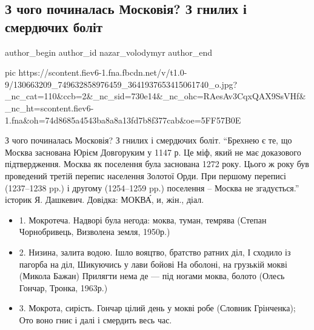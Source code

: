  
 
 
 
 
 
\subsection{З чого починалась Московія? З гнилих і смердючих боліт}
\label{sec:07_12_2020.fb.nazar_volodymyr.1.z_chogo_pochynalas_moskovia}
\ifcmt
	author_begin
   author_id nazar_volodymyr
	author_end
\fi

\ifcmt
pic https://scontent.fiev6-1.fna.fbcdn.net/v/t1.0-9/130663209_749632858976459_3641937653415061740_o.jpg?_nc_cat=110&ccb=2&_nc_sid=730e14&_nc_ohc=RAesAv3CqxQAX9SsVHf&_nc_ht=scontent.fiev6-1.fna&oh=74d8685a4543ba8a8a13fd7b8f377cab&oe=5FF57B0E
\fi

З чого починалась Московія? З гнилих і смердючих боліт. \enquote{Брехнею є те, що
Москва заснована Юрієм Довгоруким у 1147 р. Це міф, який не має доказового
підтвердження. Москва як поселення була заснована 1272 року. Цього ж року був
проведений третій перепис населення Золотої Орди. При першому переписі
(1237–1238 pp.) і другому (1254–1259 pp.) поселення – Москва не згадується.}
історик Я. Дашкевич.  Довідка: МОКВА́, и, жін., діал.

\begin{itemize}
\item 1. Мокротеча. Надворі була негода: моква, туман, темрява (Степан Чорнобривець, Визволена земля, 1950р.)
\item 2. Низина, залита водою. Ішло вояцтво, братство ратних діл, І сходило із пагорба на діл, Шикуючись у лави бойові На оболоні, на грузькій мокві (Микола Бажан) Прилягти нема де — під ногами моква, болото (Олесь Гончар, Тронка, 1963р.)
\item 3. Мокрота, сирість. Гончар цілий день у мокві робе (Словник Грінченка);  Ото воно гниє і далі і смердить весь час.
\end{itemize}

